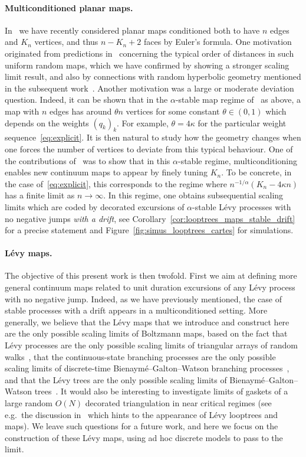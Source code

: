 \documentclass[british, a4paper,11pt]{article}
\numberwithin{equation}{section}
\theoremstyle{definition}
\begin{document}
\paragraph*{Multiconditioned planar maps.}
In~\cite{KM23} we have recently considered planar maps conditioned both to have $n$ edges and $K_n$ vertices, and thus $n-K_n+2$ faces by Euler's formula. 
One motivation originated from predictions in~\cite{FG14} concerning the typical order of distances in such uniform random maps, which we have confirmed by showing a stronger scaling limit result, and also by connections with random hyperbolic geometry mentioned in the subsequent work~\cite{CKM22}. 
Another motivation was a large or moderate deviation question. Indeed, it can be shown that in the $\alpha$-stable map regime of~\cite{LGM11} as above, a map with $n$ edges has around $\theta n$ vertices for some constant $\theta \in (0,1)$ which depends on the weights $(q_k)_k$.
For example, $\theta=4\kappa$ for the particular weight sequence~\eqref{eq:explicit}.
It is then natural to study how the geometry changes when one forces the number of vertices to deviate from this typical behaviour.
One of the contributions of~\cite{KM23} was to show that in this $\alpha$-stable regime, multiconditioning enables new continuum maps to appear by finely tuning $K_{n}$.
To be concrete, in the case of~\eqref{eq:explicit}, this corresponds to the regime where $n^{-1/\alpha} (K_{n}- 4 \kappa n)$ has a finite limit as $ n \rightarrow \infty$.
In this regime, one obtains subsequential scaling limits which are coded by decorated excursions of $\alpha$-stable L\'evy processes with no negative jumps \emph{with a drift}, see  Corollary~\ref{cor:looptrees_maps_stable_drift} for a  precise statement and Figure~\ref{fig:simus_looptrees_cartes} for simulations.



\paragraph*{L\'evy maps.}
The objective of this present work is then twofold.
First we aim at defining more general continuum maps related to unit duration excursions of any L\'evy process with no negative jump. Indeed, as we have previously mentioned, the case of stable processes with a drift appears in a multiconditioned setting. More generally, we believe that the L\'evy maps that we introduce and construct here are the only possible scaling limits of Boltzmann maps, based on the fact that L\'evy processes are the only possible scaling limits of triangular arrays of random walks~\cite[Theorem 16.14]{Kal02}, that the continuous-state branching processes are the only possible scaling limits of discrete-time Bienaym\'e--Galton--Watson branching processes~\cite{Lam67}, and that the L\'evy trees are the only possible scaling limits of Bienaym\'e--Galton--Watson trees~\cite{DLG02}. It would also be interesting to investigate limits of gaskets of a large random $O(N)$ decorated triangulation in near critical regimes (see e.g.~the discussion in~\cite[Section 5.3]{CK15} which hints to the appearance of Lévy looptrees and maps).
We leave such questions for a future work, and here we focus  on the construction of these L\'evy maps, using ad hoc discrete models to pass to the limit.
\end{document}
